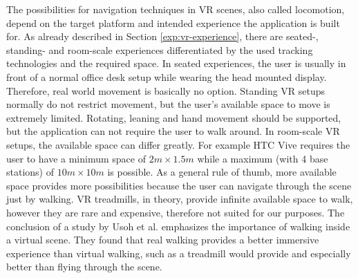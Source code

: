 The possibilities for navigation techniques in VR scenes, also called locomotion, depend on the target platform and intended experience the application is built for. As already described in Section \ref{exp:vr-experience}, there are seated-, standing- and room-scale experiences differentiated by the used tracking technologies and the required space.
In seated experiences, the user is usually in front of a normal office desk setup while wearing the head mounted display. Therefore, real world movement is basically no option. 
Standing VR setups normally do not restrict movement, but the user's available space to move is extremely limited. Rotating, leaning and hand movement should be supported, but the application can not require the user to walk around.
In room-scale VR setups, the available space can differ greatly. For example HTC Vive requires the user to have a minimum space of $2m \times 1.5m$ while a maximum (with 4 base stations) of $10m \times 10m$ is possible. As a general rule of thumb, more available space provides more possibilities because the user can navigate through the scene just by walking. 
VR treadmills, in theory, provide infinite available space to walk, however they are rare and expensive, therefore not suited for our purposes. The conclusion of a study by Usoh et al. \cite{usoh_walking_1999} emphasizes the importance of walking inside a virtual scene. They found that real walking provides a better immersive experience than virtual walking, such as a treadmill would provide and especially better than flying through the scene. 

